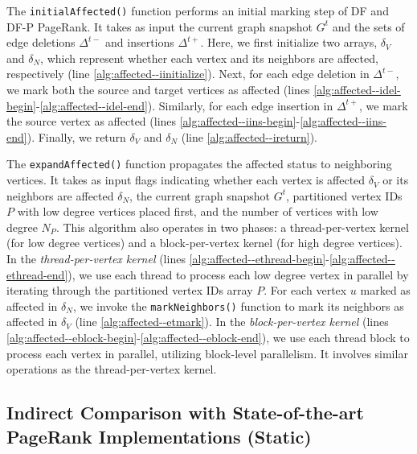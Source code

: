 The \texttt{initialAffected()} function performs an initial marking step of DF and DF-P PageRank. It takes as input the current graph snapshot $G^t$ and the sets of edge deletions $\Delta^{t-}$ and insertions $\Delta^{t+}$. Here, we first initialize two arrays, $\delta_V$ and $\delta_N$, which represent whether each vertex and its neighbors are affected, respectively (line \ref{alg:affected--iinitialize}). Next, for each edge deletion in $\Delta^{t-}$, we mark both the source and target vertices as affected (lines \ref{alg:affected--idel-begin}-\ref{alg:affected--idel-end}). Similarly, for each edge insertion in $\Delta^{t+}$, we mark the source vertex as affected (lines \ref{alg:affected--iins-begin}-\ref{alg:affected--iins-end}). Finally, we return $\delta_V$ and $\delta_N$ (line \ref{alg:affected--ireturn}).

The \texttt{expandAffected()} function propagates the affected status to neighboring vertices. It takes as input flags indicating whether each vertex is affected $\delta_V$ or its neighbors are affected $\delta_N$, the current graph snapshot $G^t$, partitioned vertex IDs $P$ with low degree vertices placed first, and the number of vertices with low degree $N_P$. This algorithm also operates in two phases: a thread-per-vertex kernel (for low degree vertices) and a block-per-vertex kernel (for high degree vertices). In the \textit{thread-per-vertex kernel} (lines \ref{alg:affected--ethread-begin}-\ref{alg:affected--ethread-end}), we use each thread to process each low degree vertex in parallel by iterating through the partitioned vertex IDs array $P$. For each vertex $u$ marked as affected in $\delta_N$, we invoke the \texttt{markNeighbors()} function to mark its neighbors as affected in $\delta_V$ (line \ref{alg:affected--etmark}). In the \textit{block-per-vertex kernel} (lines \ref{alg:affected--eblock-begin}-\ref{alg:affected--eblock-end}), we use each thread block to process each vertex in parallel, utilizing block-level parallelism. It involves similar operations as the thread-per-vertex kernel.














\subsection{Indirect Comparison with State-of-the-art PageRank Implementations (Static)}
\label{sec:static-comparison-indirect}

